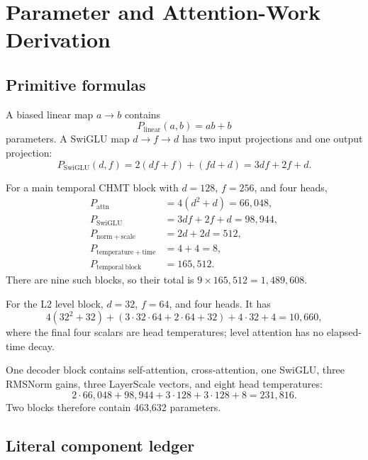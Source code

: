 \documentclass[10pt,letterpaper]{article}
\numberwithin{equation}{section}
\theoremstyle{definition}
\theoremstyle{remark}
\begin{document}
\section{Parameter and Attention-Work Derivation}

\subsection{Primitive formulas}

A biased linear map $a\rightarrow b$ contains
\begin{equation}
P_{\mathrm{linear}}(a,b)=ab+b
\label{eq:linear-params}
\end{equation}
parameters. A SwiGLU map $d\rightarrow f\rightarrow d$ has two input
projections and one output projection:
\begin{equation}
P_{\mathrm{SwiGLU}}(d,f)
=2(df+f)+(fd+d)=3df+2f+d.
\label{eq:swiglu-params}
\end{equation}

For a main temporal CHMT block with $d=128$, $f=256$, and four heads,
\begin{align}
P_{\mathrm{attn}}&=4(d^2+d)=66{,}048,\nonumber\\
P_{\mathrm{SwiGLU}}&=3df+2f+d=98{,}944,\nonumber\\
P_{\mathrm{norm+scale}}&=2d+2d=512,\nonumber\\
P_{\mathrm{temperature+time}}&=4+4=8,\nonumber\\
P_{\mathrm{temporal\ block}}&=165{,}512.
\label{eq:main-block-params}
\end{align}
There are nine such blocks, so their total is
$9\times165{,}512=1{,}489{,}608$.

For the L2 level block, $d=32$, $f=64$, and four heads. It has
\begin{equation}
4(32^2+32)+(3\cdot32\cdot64+2\cdot64+32)
+4\cdot32+4=10{,}660,
\label{eq:level-block-params}
\end{equation}
where the final four scalars are head temperatures; level attention has no
elapsed-time decay.

One decoder block contains self-attention, cross-attention, one SwiGLU, three
RMSNorm gains, three LayerScale vectors, and eight head temperatures:
\begin{equation}
2\cdot66{,}048+98{,}944+3\cdot128+3\cdot128+8
=231{,}816.
\label{eq:decoder-params}
\end{equation}
Two blocks therefore contain 463,632 parameters.

\subsection{Literal component ledger}
\end{document}
